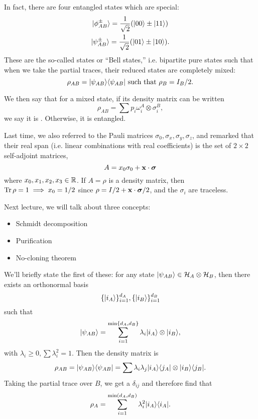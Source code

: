 In fact, there are four entangled states which are special:
\begin{gather}
    \lvert\phi^\pm_{AB}\rangle=\frac{1}{\sqrt{2}}(\lvert00\rangle\pm \lvert11\rangle)\\
    \lvert\psi^\pm_{AB}\rangle = \frac{1}{\sqrt{2}}(\lvert01\rangle\pm \lvert10\rangle).
\end{gather}
These are the so-called  states or ``Bell states,'' i.e. bipartite pure states such that when we take the partial traces, their reduced states are completely mixed:
\begin{equation}
    \rho_{AB}=\lvert\psi_{AB}\rangle\langle\psi_{AB}\rvert\text{ such that }\rho_B=I_B/2.
\end{equation}

We then say that for a mixed state, if its density matrix can be written
\begin{equation}
    \rho_{AB} = \sum p_i \omega_i^A \otimes \sigma_i^B,
\end{equation}
we say it is . Otherwise, it is entangled.

Last time, we also referred to the Pauli matrices $\sigma_0,\sigma_x,\sigma_y,\sigma_z$, and remarked that their real span (i.e. linear combinations with real coefficients) is the set of $2\times 2$ self-adjoint matrices,
\begin{equation*}
    A=x_0\sigma_0 +\boldsymbol{\mathbf{x}} \cdot \mbox{\boldmath$ \sigma $}
\end{equation*}
where $x_0,x_1,x_2,x_3\in \mathbb{R}$. If $A=\rho$ is a density matrix, then $\operatorname{Tr} \rho=1 \implies x_0=1/2$ since $\rho=I/2 + \boldsymbol{\mathbf{x}} \cdot \mbox{\boldmath$ \sigma $}/2$, and the $\sigma_i$ are traceless.

Next lecture, we will talk about three concepts:
\begin{itemize}
    \item Schmidt decomposition
    \item Purification
    \item No-cloning theorem
\end{itemize}
We'll briefly state the first of these: for any state $\lvert\psi_{AB}\rangle\in \mathcal H_A \otimes \mathcal H_B$, then there exists an orthonormal basis
\begin{equation}
    \{\lvert i_A\rangle\}_{i=1}^{d_A},\{\lvert i_B\rangle\}_{i=1}^{d_B}
\end{equation}
such that
\begin{equation}
    \lvert\psi_{AB}\rangle=\sum_{i=1}^{\min\{d_A,d_B\}}\lambda_i \lvert i_A\rangle\otimes \lvert i_B\rangle,
\end{equation}
with $\lambda_i \geq 0, \sum \lambda_i^2 = 1$. Then the density matrix is
\begin{equation}
    \rho_{AB}=\lvert\psi_{AB}\rangle\langle\psi_{AB}\rvert = \sum \lambda_i \lambda_j \lvert i_A\rangle\langle j_A\rvert\otimes \lvert i_B\rangle \langle j_B\rvert.
\end{equation}
Taking the partial trace over $B$, we get a $\delta_{ij}$ and therefore find that
\begin{equation}
    \rho_A= \sum_{i=1}^{\min(d_A,d_B)} \lambda_i^2 \lvert i_A\rangle\langle i_A\rvert.
\end{equation}